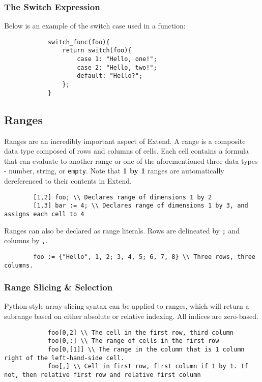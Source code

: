 		\subsubsection{The Switch Expression}
		Below is an example of the switch case used in a function:

		\begin{lstlisting}
			switch_func(foo){
				return switch(foo){
					case 1: "Hello, one!";
					case 2: "Hello, two!";
					default: "Hello?";
				};
			}
		\end{lstlisting}

	\subsection{Ranges}
	Ranges are an incredibly important aspect of Extend. A range is a composite data type composed of rows and columns of cells.
	Each cell contains a formula that can evaluate to another range or one of the aforementioned three data types - number, string, or \texttt{empty}. Note that \textbf{1 by 1} ranges are automatically dereferenced to their contents in Extend.

	\begin{lstlisting}
		[1,2] foo; \\ Declares range of dimensions 1 by 2
		[1,3] bar := 4; \\ Declares range of dimensions 1 by 3, and assigns each cell to 4
	\end{lstlisting}

	\medskip \noindent
	Ranges can also be declared as range literals. Rows are delineated by \texttt{;} and columns by \texttt{,}.

	\begin{lstlisting}
		foo := {"Hello", 1, 2; 3, 4, 5; 6, 7, 8} \\ Three rows, three columns.
	\end{lstlisting}

		\subsubsection{Range Slicing \& Selection}
		Python-style array-slicing syntax can be applied to ranges, which will return a subrange based on either absolute or relative indexing. All indices are zero-based.

		\begin{lstlisting}
			foo[0,2] \\ The cell in the first row, third column
			foo[0,:] \\ The range of cells in the first row
			foo[0,[1]] \\ The range in the column that is 1 column right of the left-hand-side cell.
			foo[,] \\ Cell in first row, first column if 1 by 1. If not, then relative first row and relative first column
		\end{lstlisting}


